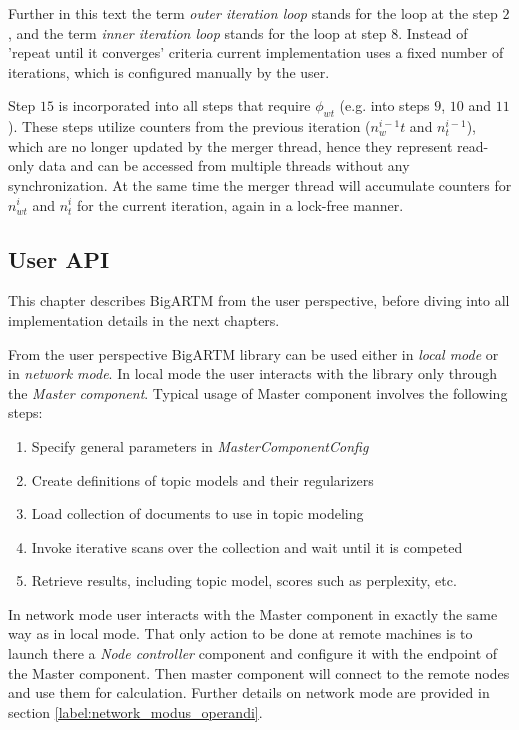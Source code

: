 \documentclass[11pt,a4paper,twoside]{report}
\begin{document}
Further in this text the term \emph {outer iteration loop} stands for the loop at the step $2$,
and the term \emph{inner iteration loop} stands for the loop at step $8$.
Instead of 'repeat until it converges' criteria
current implementation uses a fixed number of iterations,
which is configured manually by the user.

Step $15$ is incorporated into all steps that require $\phi_{wt}$
(e.g. into steps $9$, $10$ and $11$).
These steps utilize counters from the previous iteration ($n^{i-1}_wt$ and $n^{i-1}_t$),
which are no longer updated by the merger thread, hence they represent read-only data
and can be accessed from multiple threads without any synchronization.
At the same time the merger thread will accumulate counters for $n^i_{wt}$ and $n^i_t$
for the current iteration, again in a lock-free manner.

\subsection{User API}
This chapter describes BigARTM from the user perspective, before diving into all implementation details in the next chapters.

From the user perspective BigARTM library can be used either in \emph{local mode} or in \emph{network mode}.
In local mode the user interacts with the library only through the \emph{Master component}.
Typical usage of Master component involves the following steps:
\begin{enumerate}
\item Specify general parameters in \emph{MasterComponentConfig}
\item Create definitions of topic models and their regularizers
\item Load collection of documents to use in topic modeling
\item Invoke iterative scans over the collection and wait until it is competed
\item Retrieve results, including topic model, scores such as perplexity, etc.
\end{enumerate}

In network mode user interacts with the Master component in exactly the same way
as in local mode.
That only action to be done at remote machines is to launch
there a \emph{Node controller} component
and configure it with the endpoint of the Master component.
Then master component will connect to the remote nodes and use them for calculation.
Further details on network mode are provided in section \ref{label:network_modus_operandi}.
\end{document}
